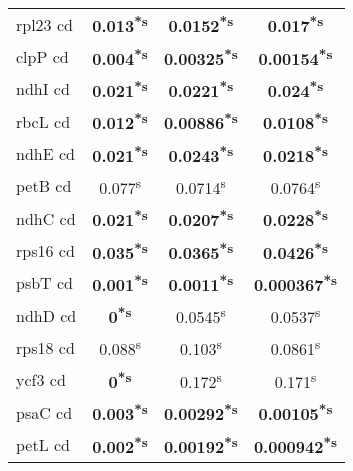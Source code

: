\documentclass[a4paper]{article}
\begin{document}
\begin{longtable}{l|c|c|c}
rpl23 cd&\textbf{0.013\textsuperscript{*}\textsuperscript{s}}&\textbf{0.0152\textsuperscript{*}\textsuperscript{s}}&\textbf{0.017\textsuperscript{*}\textsuperscript{s}}\\
clpP cd&\textbf{0.004\textsuperscript{*}\textsuperscript{s}}&\textbf{0.00325\textsuperscript{*}\textsuperscript{s}}&\textbf{0.00154\textsuperscript{*}\textsuperscript{s}}\\
ndhI cd&\textbf{0.021\textsuperscript{*}\textsuperscript{s}}&\textbf{0.0221\textsuperscript{*}\textsuperscript{s}}&\textbf{0.024\textsuperscript{*}\textsuperscript{s}}\\
rbcL cd&\textbf{0.012\textsuperscript{*}\textsuperscript{s}}&\textbf{0.00886\textsuperscript{*}\textsuperscript{s}}&\textbf{0.0108\textsuperscript{*}\textsuperscript{s}}\\
ndhE cd&\textbf{0.021\textsuperscript{*}\textsuperscript{s}}&\textbf{0.0243\textsuperscript{*}\textsuperscript{s}}&\textbf{0.0218\textsuperscript{*}\textsuperscript{s}}\\
petB cd&0.077\textsuperscript{s}&0.0714\textsuperscript{s}&0.0764\textsuperscript{s}\\
ndhC cd&\textbf{0.021\textsuperscript{*}\textsuperscript{s}}&\textbf{0.0207\textsuperscript{*}\textsuperscript{s}}&\textbf{0.0228\textsuperscript{*}\textsuperscript{s}}\\
rps16 cd&\textbf{0.035\textsuperscript{*}\textsuperscript{s}}&\textbf{0.0365\textsuperscript{*}\textsuperscript{s}}&\textbf{0.0426\textsuperscript{*}\textsuperscript{s}}\\
psbT cd&\textbf{0.001\textsuperscript{*}\textsuperscript{s}}&\textbf{0.0011\textsuperscript{*}\textsuperscript{s}}&\textbf{0.000367\textsuperscript{*}\textsuperscript{s}}\\
ndhD cd&\textbf{0\textsuperscript{*}\textsuperscript{s}}&0.0545\textsuperscript{s}&0.0537\textsuperscript{s}\\
rps18 cd&0.088\textsuperscript{s}&0.103\textsuperscript{s}&0.0861\textsuperscript{s}\\
ycf3 cd&\textbf{0\textsuperscript{*}\textsuperscript{s}}&0.172\textsuperscript{s}&0.171\textsuperscript{s}\\
psaC cd&\textbf{0.003\textsuperscript{*}\textsuperscript{s}}&\textbf{0.00292\textsuperscript{*}\textsuperscript{s}}&\textbf{0.00105\textsuperscript{*}\textsuperscript{s}}\\
petL cd&\textbf{0.002\textsuperscript{*}\textsuperscript{s}}&\textbf{0.00192\textsuperscript{*}\textsuperscript{s}}&\textbf{0.000942\textsuperscript{*}\textsuperscript{s}}\\

\end{longtable}
\end{document}
